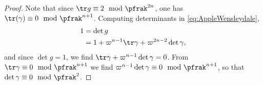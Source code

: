 \begin{proof}
	Note that since $\tr g \equiv 2 \mod \pfrak^{2n}$, one has $\tr(\gamma) \equiv 0 \mod \pfrak^{n+1}$.
	Computing determinants in \ref{eq:AppleWensleydale},
	\begin{align*}
		1 & = \det g                                                  \\
		  & = 1 + \varpi^{n-1} \tr \gamma + \varpi^{2n-2}\det \gamma,
	\end{align*}
	and since $\det g =1$, we find $\tr \gamma +\varpi^{n-1}\det \gamma =0$. From $\tr \gamma  \equiv 0 \mod \pfrak^{n+1}$ we find $ \varpi^{n-1}\det \gamma \equiv 0 \mod \pfrak^{n+1}$, so that $\det \gamma \equiv 0 \mod \pfrak^2$.






\end{proof}
